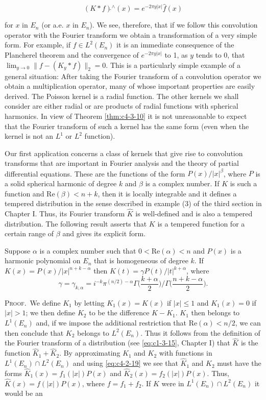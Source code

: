 \[
(K* f)\hat{}^{\wedge}(x)=e^{-2\pi y\vert x\vert}\hat{f}(x)
\]

for $x$ in $E_n$ (or a.e. $x$ in $E_n$). We see, therefore, that if we follow this convolution operator with the Fourier transform we obtain a transformation of a very simple form. For example, if $f \in L^2(E_n)$ it is an immediate consequence of the Plancherel theorem and the convergence of $e^{-2\pi y|x|}$ to 1, as $y$ tends to 0, that $\lim_{y \to 0} \|f - (K_y * f)\|_2 = 0$. This is a particularly simple example of a general situation: After taking the Fourier transform of a convolution operator we obtain a multiplication operator, many of whose important properties are easily derived. The Poisson kernel is a radial function. The other kernels we shall consider are either radial or are products of radial functions with spherical harmonics. In view of Theorem \ref{thm:c4-3-10} it is not unreasonable to expect that the Fourier transform of such a kernel has the same form (even when the kernel is not an $L^1$ or $L^2$ function).

Our first application concerns a class of kernels that give rise to convolution transforms that are important in Fourier analysis and the theory of partial differential equations. These are the functions of the form $P(x)/|x|^\beta$, where $P$ is a solid spherical harmonic of degree $k$ and $\beta$ is a complex number. If $K$ is such a function and $\text{Re}(\beta) < n + k$, then it is locally integrable and it defines a tempered distribution in the sense described in example (3) of the third section in Chapter I. Thus, its Fourier transform $\hat{K}$ is well-defined and is also a tempered distribution. The following result asserts that $K$ is a tempered function for a certain range of $\beta$ and gives its explicit form.

\begin{theorem}
\label{thm:c4-4-1}
Suppose $\alpha$ is a complex number such that $0 < \text{Re}(\alpha) < n$ and $P(x)$ is a harmonic polynomial on $E_n$ that is homogeneous of degree $k$. If $K(x) = P(x)/|x|^{n+k-\alpha}$ then $\hat{K}(t) = \gamma P(t)/|t|^{k+\alpha}$, where
\[
\gamma=\gamma_{k,\alpha}=i^{-k}\pi^{(n/2)-\alpha}\Gamma\bigg(\frac{k+\alpha}{2}\bigg)\bigg/\Gamma\bigg(\frac{n+k-\alpha}{2}\bigg).
\]

\end{theorem}

\textsc{Proof.}\ We define $K_1$ by letting $K_1(x) = K(x)$ if $|x| \leq 1$ and $K_1(x) = 0$ if $|x| > 1$; we then define $K_2$ to be the difference $K - K_1$. $K_1$ then belongs to $L^1(E_n)$ and, if we impose the additional restriction that $\text{Re}(\alpha) < n/2$, we can then conclude that $K_2$ belongs to $L^2(E_n)$. Thus it follows from the definition of the Fourier transform of a distribution (see \eqref{eq:c1-3-15}, Chapter I) that $\hat{K}$ is the function $\hat{K}_1 + \hat{K}_2$. By approximating $K_1$ and $K_2$ with functions in $L^1(E_n) \cap L^2(E_n)$ and using \eqref{eq:c4-2-19} we see that $\hat{K}_1$ and $\hat{K}_2$ must have the forms $\hat{K}_1(x) = f_1(|x|)P(x)$ and $\hat{K}_2(x) = f_2(|x|)P(x)$. Thus, $\hat{K}(x) = f(|x|)P(x)$, where $f = f_1 + f_2$. If $K$ were in $L^1(E_n) \cap L^2(E_n)$ it would be an

